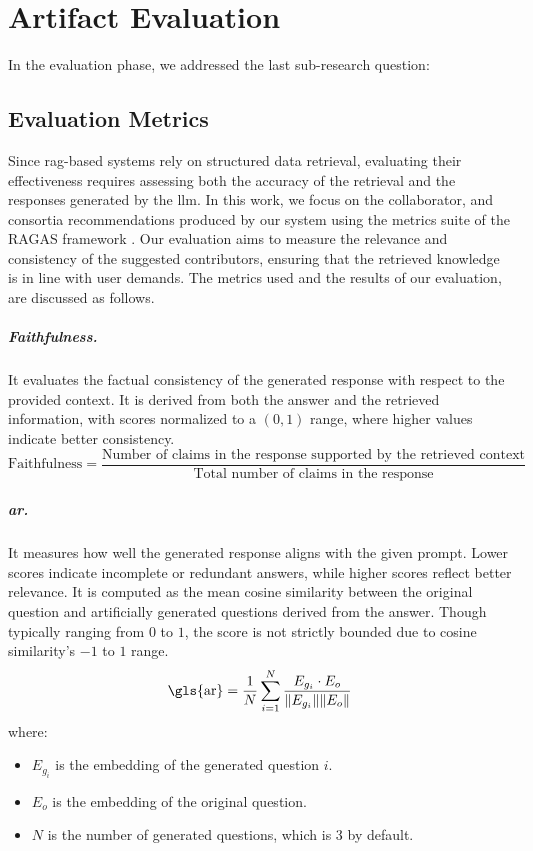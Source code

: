 \chapter{Artifact Evaluation}\label{chap:evaluation}

In the evaluation phase, we addressed the last sub-research question:
\begin{center}
    \rqFour
\end{center}

\section{Evaluation Metrics}\label{sec:evaluation-metrics}
Since \gls{rag}-based systems rely on structured data retrieval, evaluating their effectiveness requires assessing both the accuracy of the retrieval and the responses generated by the \gls{llm}.
In this work, we focus on the collaborator, and consortia recommendations produced by our system using the metrics suite of the RAGAS framework \cite{ragas2024}.
Our evaluation aims to measure the relevance and consistency of the suggested contributors, ensuring that the retrieved knowledge is in line with user demands.
The metrics used and the results of our evaluation, are discussed as follows.

\paragraph*{Faithfulness.} It evaluates the factual consistency of the generated response with respect to the provided context.
It is derived from both the answer and the retrieved information, with scores normalized to a $(0,1)$ range, where higher values indicate better consistency.
\[
\text{Faithfulness} =
\frac{\text{Number of claims in the response supported by the retrieved context}}
{\text{Total number of claims in the response}}
\]

\paragraph*{\gls{ar}.} It measures how well the generated response aligns with the given prompt.
Lower scores indicate incomplete or redundant answers, while higher scores reflect better relevance.
It is computed as the mean cosine similarity between the original question and artificially generated questions derived from the answer.
Though typically ranging from $0$ to $1$, the score is not strictly bounded due to cosine similarity's $-1$ to $1$ range.
\[
\text{\gls{ar}} =
\frac{1}{N} \sum_{i=1}^{N} \frac{E_{g_i} \cdot E_o}{\|E_{g_i}\| \|E_o\|}
\]
where:
\begin{itemize}
    \item $E_{g_i}$ is the embedding of the generated question $i$.
    \item $E_o$ is the embedding of the original question.
    \item $N$ is the number of generated questions, which is 3 by default.
\end{itemize}

